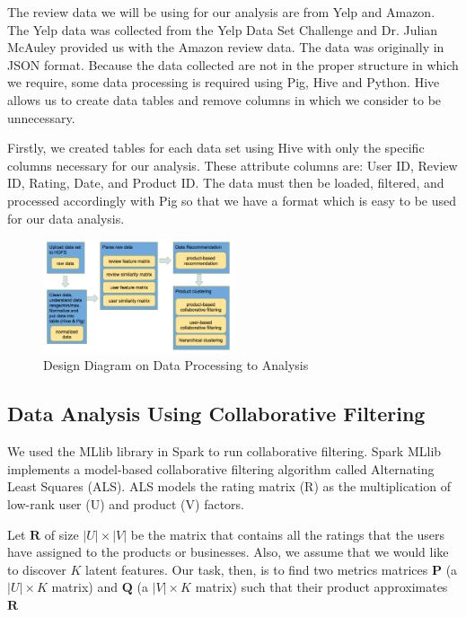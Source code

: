 \documentclass[conference]{IEEEtran}
\begin{document}
The review data we will be using for our analysis are from Yelp and Amazon.  The Yelp data was collected from the Yelp Data Set Challenge and Dr. Julian McAuley provided us with the Amazon review data.  The data was originally in JSON format.  Because the data collected are not in the proper structure in which we require, some data processing is required using Pig, Hive and Python.  Hive allows us to create data tables and remove columns in which we consider to be unnecessary.

Firstly, we created tables for each data set using Hive with only the specific columns necessary for our analysis. These  attribute columns are: User ID, Review ID, Rating, Date, and Product ID. The data must then be loaded, filtered, and processed accordingly with Pig so that we have a format which is easy to be used for our data analysis.

\begin{figure}[h]
\centering
\includegraphics[width=0.5\textwidth]{image/design_diagram}
\caption{Design Diagram on Data Processing to Analysis}
\end{figure}

\subsection{Data Analysis Using Collaborative Filtering}

We used the MLlib library in Spark to run collaborative filtering. Spark MLlib implements a model-based collaborative filtering algorithm called Alternating Least Squares (ALS). ALS models the rating matrix (R) as the multiplication of low-rank user (U) and product (V) factors.  


Let $\boldsymbol{R}$ of size $|U| \times |V|$ be the matrix that contains all the ratings that the users have assigned to the products or businesses. Also, we assume that we would like to discover $K$ latent features. Our task, then, is to find two metrics matrices $\boldsymbol{P}$ (a $|U| \times K$ matrix) and $\boldsymbol{Q}$ (a $|V| \times K$ matrix) such that their product approximates $\boldsymbol{R}$
\end{document}
